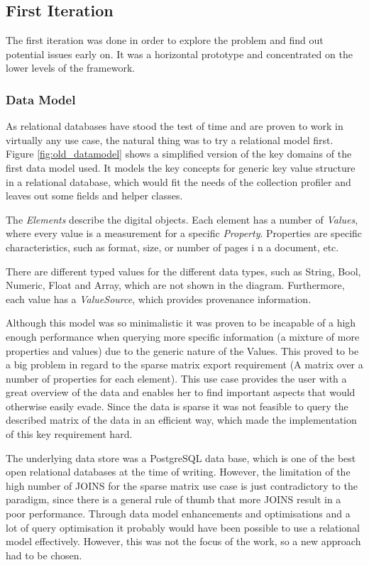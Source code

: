 \subsection{First Iteration}
The first iteration was done in order to explore the problem and find out potential issues early on. It was a horizontal prototype and concentrated on the lower levels of the framework.

\subsubsection{Data Model}
As relational databases have stood the test of time and are proven to work in virtually any use case, the natural thing was to try a relational model first. Figure \ref{fig:old_datamodel} shows a simplified version of the key domains of the first data model used. It models the key concepts for generic key value structure in a relational database, which would fit the needs of the collection profiler and leaves out some fields and helper classes. 

The \textit{Elements} describe the digital objects. Each element has a number of \textit{Values}, where every value is a measurement for a specific \textit{Property}. Properties are specific characteristics, such as format, size, or number of pages i n a document, etc. 

There are different typed values for the different data types, such as String, Bool, Numeric, Float and Array, which are not shown in the diagram. Furthermore, each value has a \textit{ValueSource}, which provides provenance information.

Although this model was so minimalistic it was proven to be incapable of a high enough performance when querying more specific information (a mixture of more properties and values) due to the generic nature of the Values. This proved to be a big problem in regard to the sparse matrix export requirement (A matrix over a number of properties for each element). This use case provides the user with a great overview of the data and enables her to find important aspects that would otherwise easily evade. Since the data is sparse it was not feasible to query the described matrix of the data in an efficient way, which made the implementation of this key requirement hard.

The underlying data store was a PostgreSQL data base, which is one of the best open relational databases at the time of writing. However, the limitation of the high number of JOINS for the sparse matrix use case is just contradictory to the paradigm, since there is a general rule of thumb that more JOINS result in a poor performance. Through data model enhancements and optimisations and a lot of query optimisation it probably would have been possible to use a relational model effectively. However, this was not the focus of the work, so a new approach had to be chosen.

